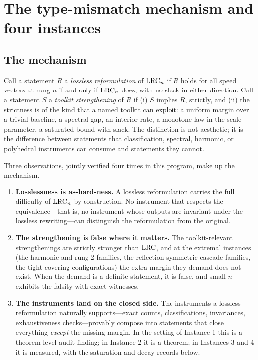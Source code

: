 
\section{The type-mismatch mechanism and four instances}\label{sec:tm}

\subsection{The mechanism}\label{sec:tm-mech}

Call a statement $R$ a \emph{lossless reformulation} of $\mathrm{LRC}_n$ if $R$
holds for all speed vectors at rung $n$ if and only if $\mathrm{LRC}_n$ does, with
no slack in either direction. Call a statement $S$ a \emph{toolkit
strengthening} of $R$ if (i) $S$ implies $R$, strictly, and (ii) the
strictness is of the kind that a named toolkit can exploit: a uniform
margin over a trivial baseline, a spectral gap, an interior rate, a
monotone law in the scale parameter, a saturated bound with slack. The
distinction is not aesthetic; it is the difference between statements
that classification, spectral, harmonic, or polyhedral instruments can
consume and statements they cannot.

Three observations, jointly verified four times in this program, make up
the mechanism.

\begin{enumerate}[leftmargin=1.6em,itemsep=2pt]
\item \textbf{Losslessness is as-hard-ness.} A lossless reformulation
carries the full difficulty of $\mathrm{LRC}_n$ by construction. No instrument
that respects the equivalence---that is, no instrument whose outputs are
invariant under the lossless rewriting---can distinguish the
reformulation from the original.
\item \textbf{The strengthening is false where it matters.} The
toolkit-relevant strengthenings are strictly stronger than $\mathrm{LRC}$, and at
the extremal instances (the harmonic and rung-2 families, the
reflection-symmetric cascade families, the tight covering
configurations) the extra margin they demand does not exist. When the
demand is a definite statement, it is false, and small $n$ exhibits the
falsity with exact witnesses.
\item \textbf{The instruments land on the closed side.} The instruments a
lossless reformulation naturally supports---exact counts,
classifications, invariances, exhaustiveness checks---provably compose
into statements that close everything \emph{except} the missing margin.
In the setting of Instance 1 this is a theorem-level audit finding; in
Instance 2 it is a theorem; in Instances 3 and 4 it is measured, with the
saturation and decay records below.
\end{enumerate}

